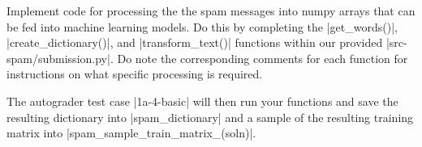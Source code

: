 \item {}
Implement code for processing the the spam messages into numpy arrays that can be fed into machine learning models. Do this by completing the |get_words()|, |create_dictionary()|, and |transform_text()| functions within our provided |src-spam/submission.py|. Do note the corresponding comments for each function for instructions on what specific processing is required.

The autograder test case |1a-4-basic| will then run your functions and save the resulting dictionary into |spam_dictionary| and a sample of the resulting training matrix into |spam_sample_train_matrix_(soln)|.

